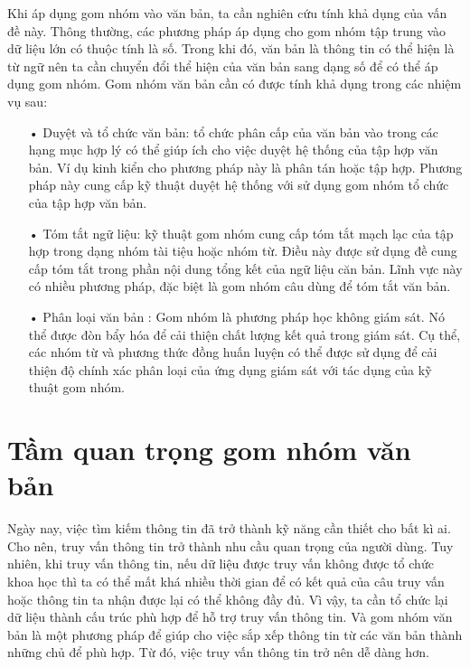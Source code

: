Khi áp dụng gom nhóm vào văn bản, ta cần nghiên cứu tính khả dụng của vấn đề này.
Thông thường, các phương pháp áp dụng cho gom nhóm tập trung vào dữ liệu lớn có thuộc tính là số.
Trong khi đó, văn bản là thông tin có thể hiện là từ ngữ nên ta cần chuyển đổi thể hiện của văn bản sang dạng số để có thể áp dụng gom nhóm.
Gom nhóm văn bản cần có được tính khả dụng trong các nhiệm vụ sau:
\begin{enumerate}
\item[•]Duyệt và tổ chức văn bản: tổ chức phân cấp của văn bản vào trong các hạng mục hợp lý có thể giúp ích cho việc duyệt hệ thống của tập hợp văn bản. Ví dụ kinh kiển cho phương pháp này là phân tán hoặc tập hợp. Phương pháp này cung cấp kỹ thuật duyệt hệ thống với sử dụng gom nhóm tổ chức của tập hợp văn bản.
\item[•]Tóm tắt ngữ liệu: kỹ thuật gom nhóm cung cấp tóm tắt mạch lạc của tập hợp trong dạng nhóm tài tiệu hoặc nhóm từ. Điều này được sử dụng đề cung cấp tóm tắt trong phần nội dung tổng kết của ngữ liệu căn bản. Lĩnh vực này có nhiều phương pháp, đặc biệt là gom nhóm câu dùng để tóm tắt văn bản.
\item[•]Phân loại văn bản : Gom nhóm là phương pháp học không giám sát. Nó thể được đòn bẩy hóa để cải thiện chất lượng kết quả trong giám sát. Cụ thể, các nhóm từ và phương thức đồng huấn luyện có thể được sử dụng để cải thiện độ chính xác phân loại của ứng dụng giám sát với tác dụng của kỹ thuật gom nhóm.
\end{enumerate}

\section{Tầm quan trọng gom nhóm văn bản}
Ngày nay, việc tìm kiếm thông tin đã trở thành kỹ năng cần thiết cho bất kì ai.
Cho nên, truy vấn thông tin trở thành nhu cầu quan trọng của người dùng.
Tuy nhiên, khi truy vấn thông tin, nếu dữ liệu được truy vấn không được tổ chức khoa học thì ta có thể mất khá nhiều thời gian để có kết quả của câu truy vấn hoặc thông tin ta nhận được lại có thể không đầy đủ.
Vì vậy, ta cần tổ chức lại dữ liệu thành cấu trúc phù hợp để hỗ trợ truy vấn thông tin.
Và gom nhóm văn bản là một phương pháp để giúp cho việc sắp xếp thông tin từ các văn bản thành những chủ để phù hợp.
Từ đó, việc truy vấn thông tin trở nên dễ dàng hơn.

